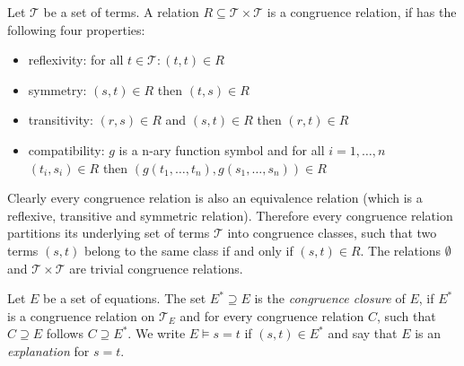 \documentclass[smallextended]{svjour3}
\begin{document}
\begin{definition}

Let $\mathcal{T}$ be a set of terms.
A relation $R \subseteq \mathcal{T} \times \mathcal{T}$ is a congruence relation, if has the following four properties:
\begin{itemize}
	\item reflexivity: for all $t \in \mathcal{T}: (t,t) \in R$
	\item symmetry: $(s,t) \in R$ then $(t,s) \in R$
	\item transitivity: $(r,s) \in R$ and $(s,t) \in R$ then $(r,t) \in R$
	\item compatibility: $g$ is a n-ary function symbol and for all $i = 1,\ldots,n$ $(t_i,s_i) \in R$ then $(g(t_1,\ldots,t_n),g(s_1,\ldots,s_n)) \in R$
\end{itemize}

\end{definition}

Clearly every congruence relation is also an equivalence relation (which is a reflexive, transitive and symmetric relation).
Therefore every congruence relation partitions its underlying set of terms $\mathcal{T}$ into congruence classes, such that two terms $(s,t)$ belong to the same class if and only if $(s,t) \in R$.
The relations $\emptyset$ and $\mathcal{T} \times \mathcal{T}$ are trivial congruence relations.


\begin{definition}

Let $E$ be a set of equations.
The set $E^* \supseteq E$ is the \emph{congruence closure} of $E$, 
if $E^*$ is a congruence relation on $\mathcal{T}_E$ and for every congruence relation $C$, such that $C \supseteq E$ follows $C \supseteq E^*$.
We write $E \models s = t$ if $(s,t) \in E^*$ and say that $E$ is an \emph{explanation} for $s = t$.

\end{definition}
\end{document}
